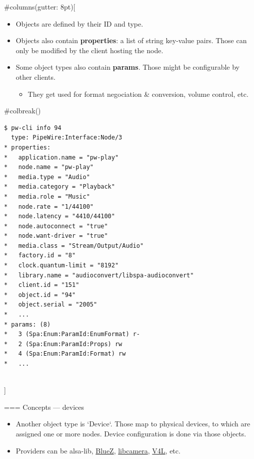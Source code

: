 #columns(gutter: 8pt)[
      \begin{itemize}
      \item Objects are defined by their ID and type.

      \item Objects also contain \textbf{properties}: a list of string
        key-value pairs. Those can only be modified by the client
        hosting the node.

      \item Some object types also contain \textbf{params}. Those might
        be configurable by other clients.

        \begin{itemize}
        \item They get used for format negociation \& conversion,
          volume control, etc.
        \end{itemize}
      \end{itemize}

     #colbreak()
    \begin{block}{}
      \fontsize{8}{8}\selectfont
        \begin{verbatim}
$ pw-cli info 94
  type: PipeWire:Interface:Node/3
* properties:
*   application.name = "pw-play"
*   node.name = "pw-play"
*   media.type = "Audio"
*   media.category = "Playback"
*   media.role = "Music"
*   node.rate = "1/44100"
*   node.latency = "4410/44100"
*   node.autoconnect = "true"
*   node.want-driver = "true"
*   media.class = "Stream/Output/Audio"
*   factory.id = "8"
*   clock.quantum-limit = "8192"
*   library.name = "audioconvert/libspa-audioconvert"
*   client.id = "151"
*   object.id = "94"
*   object.serial = "2005"
*   ...
* params: (8)
*   3 (Spa:Enum:ParamId:EnumFormat) r-
*   2 (Spa:Enum:ParamId:Props) rw
*   4 (Spa:Enum:ParamId:Format) rw
*   ...
        \end{verbatim}
      \end{block}

  \\]




=== {Concepts — devices}
  \begin{itemize}

  \item Another object type is `Device`. Those map to physical
    devices, to which are assigned one or more nodes. Device
    configuration is done via those objects.

  \item Providers can be alsa-lib, \href{https://www.bluez.org/}{BlueZ},
    \href{https://libcamera.org/}{libcamera},
    \href{https://en.wikipedia.org/wiki/Video4Linux}{V4L}, etc.

  \end{itemize}




